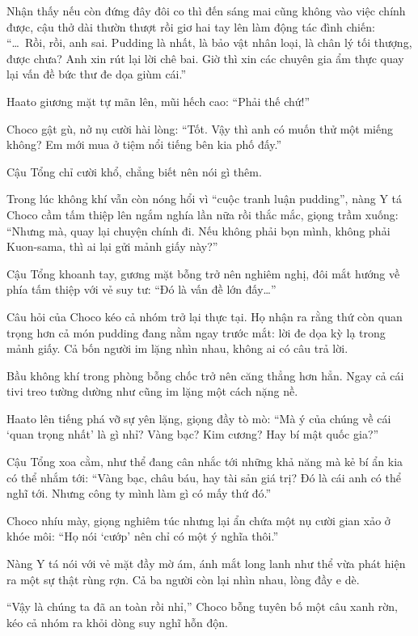 \documentclass[../main.tex]{subfiles}
\begin{document}
Nhận thấy nếu còn đứng đây đôi co thì đến sáng mai cũng không vào việc chính được, cậu thở dài thườn thượt rồi giơ hai tay lên làm động tác đình chiến: ``\dots\ Rồi, rồi, anh sai. Pudding là nhất, là bảo vật nhân loại, là chân lý tối thượng, được chưa? Anh xin rút lại lời chê bai. Giờ thì xin các chuyên gia ẩm thực quay lại vấn đề bức thư đe dọa giùm cái.''

Haato giương mặt tự mãn lên, mũi hếch cao: ``Phải thế chứ!''

Choco gật gù, nở nụ cười hài lòng: ``Tốt. Vậy thì anh có muốn thử một miếng không? Em mới mua ở tiệm nổi tiếng bên kia phố đấy.''

Cậu Tổng chỉ cười khổ, chẳng biết nên nói gì thêm.

\ct

Trong lúc không khí vẫn còn nóng hổi vì ``cuộc tranh luận pudding'', nàng Y tá Choco cầm tấm thiệp lên ngắm nghía lần nữa rồi thắc mắc, giọng trầm xuống: ``Nhưng mà, quay lại chuyện chính đi. Nếu không phải bọn mình, không phải Kuon-sama, thì ai lại gửi mảnh giấy này?''

Cậu Tổng khoanh tay, gương mặt bỗng trở nên nghiêm nghị, đôi mắt hướng về phía tấm thiệp với vẻ suy tư: ``Đó là vấn đề lớn đấy\dots''

Câu hỏi của Choco kéo cả nhóm trở lại thực tại. Họ nhận ra rằng thứ còn quan trọng hơn cả món pudding đang nằm ngay trước mắt: lời đe dọa kỳ lạ trong mảnh giấy. Cả bốn người im lặng nhìn nhau, không ai có câu trả lời.

Bầu không khí trong phòng bỗng chốc trở nên căng thẳng hơn hẳn. Ngay cả cái tivi treo tường dường như cũng im lặng một cách nặng nề.

Haato lên tiếng phá vỡ sự yên lặng, giọng đầy tò mò: ``Mà ý của chúng về cái `quan trọng nhất' là gì nhỉ? Vàng bạc? Kim cương? Hay bí mật quốc gia?''

Cậu Tổng xoa cằm, như thể đang cân nhắc tới những khả năng mà kẻ bí ẩn kia có thể nhắm tới: ``Vàng bạc, châu báu, hay tài sản giá trị? Đó là cái anh có thể nghĩ tới. Nhưng công ty mình làm gì có mấy thứ đó.''

Choco nhíu mày, giọng nghiêm túc nhưng lại ẩn chứa một nụ cười gian xảo ở khóe môi: ``Họ nói `cướp' nên chỉ có một ý nghĩa thôi.''

Nàng Y tá nói với vẻ mặt đầy mờ ám, ánh mắt long lanh như thể vừa phát hiện ra một sự thật rùng rợn. Cả ba người còn lại nhìn nhau, lòng đầy e dè.

\ct

``Vậy là chúng ta đã an toàn rồi nhỉ,'' Choco bỗng tuyên bố một câu xanh rờn, kéo cả nhóm ra khỏi dòng suy nghĩ hỗn độn.
\end{document}
